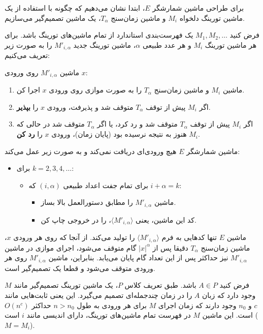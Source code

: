 برای طراحی ماشین شمارشگر $E$، ابتدا نشان می‌دهیم که چگونه با استفاده از یک ماشین تورینگ دلخواه $M_i$ و ماشین زمان‌سنج $T_\alpha$، یک ماشین تصمیم‌گیر می‌سازیم.

فرض کنید $M_1, M_2, \dots$ یک فهرست‌بندی استاندارد از تمام ماشین‌های تورینگ باشد. برای هر ماشین تورینگ $M_i$ و هر عدد طبیعی $\alpha$، ماشین تورینگ جدید $M'_{i, \alpha}$ را به صورت زیر تعریف می‌کنیم:

\noindent ماشین $M'_{i, \alpha}$ روی ورودی $x$:
\begin{enumerate}
    \item ماشین $M_i$ و ماشین زمان‌سنج $T_\alpha$ را به صورت موازی روی ورودی $x$ اجرا کن.
    \item اگر $M_i$ پیش از توقف $T_\alpha$ متوقف شد و پذیرفت، ورودی $x$ را \textbf{بپذیر}.
    \item اگر $M_i$ پیش از توقف $T_\alpha$ متوقف شد و رد کرد، یا اگر $T_\alpha$ متوقف شد در حالی که $M_i$ هنوز به نتیجه نرسیده بود (پایان زمان)، ورودی $x$ را \textbf{رد کن}.
\end{enumerate}

ماشین شمارشگر $E$ هیچ ورودی‌ای دریافت نمی‌کند و به صورت زیر عمل می‌کند:
\begin{itemize}
    \item برای $k = 2, 3, 4, \dots$:
    \begin{itemize}
        \item برای تمام جفت اعداد طبیعی $(i, \alpha)$ که $i + \alpha = k$:
        \begin{itemize}
            \item ماشین $M'_{i, \alpha}$ را مطابق دستورالعمل بالا بساز.
            \item کد این ماشین، یعنی $\langle M'_{i, \alpha} \rangle$، را در خروجی چاپ کن.
        \end{itemize}
    \end{itemize}
\end{itemize}

ماشین $E$ تنها کدهایی به فرم $\langle M'_{i, \alpha} \rangle$ را تولید می‌کند. از آنجا که روی هر ورودی $x$، ماشین زمان‌سنج $T_\alpha$ دقیقا پس از $|x|^\alpha$ گام متوقف می‌شود، اجرای موازی در ماشین $M'_{i, \alpha}$ نیز حداکثر پس از این تعداد گام پایان می‌یابد. بنابراین، ماشین $M'_{i, \alpha}$ روی هر ورودی متوقف می‌شود و قطعا یک تصمیم‌گیر است.

فرض کنید $A \in P$ باشد. طبق تعریف کلاس $P$، یک ماشین تورینگ تصمیم‌گیر مانند $M$ وجود دارد که زبان $A$ را در زمان چندجمله‌ای تصمیم می‌گیرد. این یعنی ثابت‌هایی مانند $c$ و $n_0$ وجود دارند که زمان اجرای $M$ برای هر ورودی به طول $n > n_0$ حداکثر $O(n^c)$ است.
این ماشین $M$ در فهرست تمام ماشین‌های تورینگ، دارای اندیسی مانند $i$ است ($M = M_i$). 

